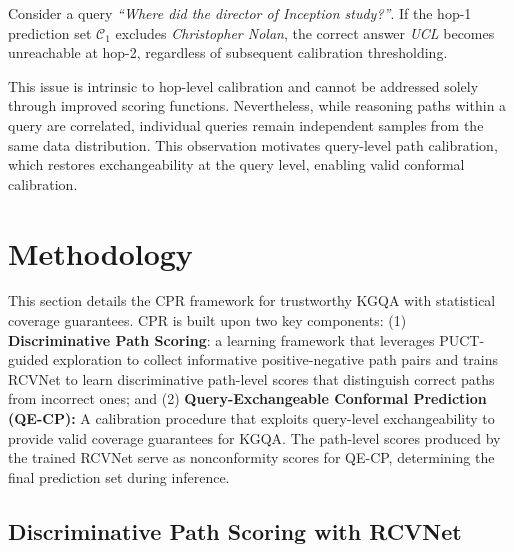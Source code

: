 \documentclass{article}
\newcommand{\ch}[1]{\textcolor{blue}{[CZ: #1]}}
\theoremstyle{plain}
\theoremstyle{definition}
\theoremstyle{remark}
\begin{document}
Consider a query \emph{``Where did the director of Inception study?''}. If the hop-1 prediction set $\mathcal{C}_1$ excludes \textit{Christopher Nolan}, the correct answer \textit{UCL} becomes unreachable at hop-2, regardless of subsequent calibration thresholding.

This issue is intrinsic to hop-level calibration and cannot be addressed solely through improved scoring functions. Nevertheless, %
while reasoning paths within a query are correlated, individual queries remain independent samples from the same data distribution. This observation motivates query-level path calibration, which restores exchangeability at the query level, enabling valid conformal calibration. %

\section{Methodology}

\label{sec:method}
This section details the CPR framework for trustworthy KGQA with statistical coverage guarantees. CPR is built upon two key components:
(1) \textbf{Discriminative Path Scoring}: a learning framework that leverages PUCT-guided exploration to collect informative positive-negative path pairs and trains RCVNet to learn discriminative path-level scores that distinguish correct paths from incorrect ones; and (2) \textbf{Query-Exchangeable Conformal Prediction (QE-CP):} A calibration procedure that exploits query-level exchangeability to provide valid coverage guarantees for KGQA. The path-level scores produced by the trained RCVNet serve as nonconformity scores for QE-CP, determining the final prediction set during inference. 


\subsection{Discriminative Path Scoring with RCVNet}
\label{subsec:rcvnet}
\end{document}
